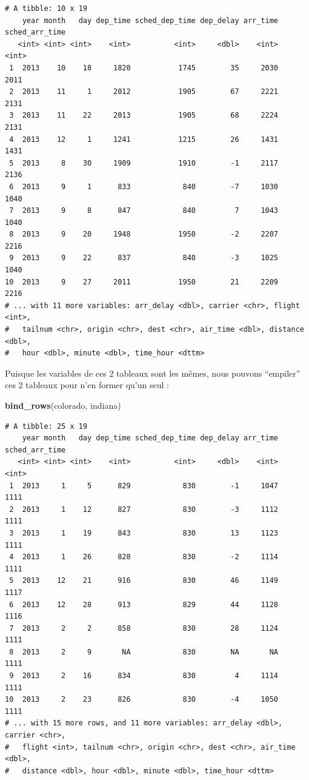 \documentclass[a4paperpaper,]{article}
\newenvironment{Shaded}{\begin{snugshade}}{\end{snugshade}}
\newcommand{\KeywordTok}[1]{\textcolor[rgb]{0.13,0.29,0.53}{\textbf{#1}}}
\newcommand{\NormalTok}[1]{#1}
\theoremstyle{definition}
\theoremstyle{definition}
\theoremstyle{definition}
\theoremstyle{remark}
\begin{document}
\begin{verbatim}
# A tibble: 10 x 19
    year month   day dep_time sched_dep_time dep_delay arr_time sched_arr_time
   <int> <int> <int>    <int>          <int>     <dbl>    <int>          <int>
 1  2013    10    18     1820           1745        35     2030           2011
 2  2013    11     1     2012           1905        67     2221           2131
 3  2013    11    22     2013           1905        68     2224           2131
 4  2013    12     1     1241           1215        26     1431           1431
 5  2013     8    30     1909           1910        -1     2117           2136
 6  2013     9     1      833            840        -7     1030           1040
 7  2013     9     8      847            840         7     1043           1040
 8  2013     9    20     1948           1950        -2     2207           2216
 9  2013     9    22      837            840        -3     1025           1040
10  2013     9    27     2011           1950        21     2209           2216
# ... with 11 more variables: arr_delay <dbl>, carrier <chr>, flight <int>,
#   tailnum <chr>, origin <chr>, dest <chr>, air_time <dbl>, distance <dbl>,
#   hour <dbl>, minute <dbl>, time_hour <dttm>
\end{verbatim}

Puisque les variables de ces 2 tableaux sont les mêmes, nous pouvons
``empiler'' ces 2 tableaux pour n'en former qu'un seul :

\begin{Shaded}
\begin{Highlighting}[]
\KeywordTok{bind_rows}\NormalTok{(colorado, indiana)}
\end{Highlighting}
\end{Shaded}

\begin{verbatim}
# A tibble: 25 x 19
    year month   day dep_time sched_dep_time dep_delay arr_time sched_arr_time
   <int> <int> <int>    <int>          <int>     <dbl>    <int>          <int>
 1  2013     1     5      829            830        -1     1047           1111
 2  2013     1    12      827            830        -3     1112           1111
 3  2013     1    19      843            830        13     1123           1111
 4  2013     1    26      828            830        -2     1114           1111
 5  2013    12    21      916            830        46     1149           1117
 6  2013    12    28      913            829        44     1128           1116
 7  2013     2     2      858            830        28     1124           1111
 8  2013     2     9       NA            830        NA       NA           1111
 9  2013     2    16      834            830         4     1114           1111
10  2013     2    23      826            830        -4     1050           1111
# ... with 15 more rows, and 11 more variables: arr_delay <dbl>, carrier <chr>,
#   flight <int>, tailnum <chr>, origin <chr>, dest <chr>, air_time <dbl>,
#   distance <dbl>, hour <dbl>, minute <dbl>, time_hour <dttm>
\end{verbatim}
\end{document}
